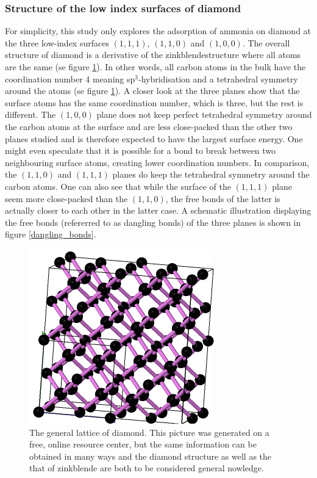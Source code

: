 \documentclass[10pt,a4paper]{article}
\begin{document}
\subsubsection{Structure of the low index surfaces of diamond}
For simplicity, this study only explores the adsorption of ammonia on diamond at the three low-index surfaces $(1,  1, 1)$, $(1,  1,  0)$ and $(1,  0,  0)$. The overall structure of diamond is a derivative of the zinkblendestructure where all atoms are the same (se figure \ref{diamond_general}). In other words, all carbon atoms in the bulk have the coordination number 4 meaning sp$^3$-hybridisation and a tetrahedral symmetry around the atoms  (se figure \ref{diamond_general}). A closer look at the three planes show that the surface atoms has the same coordination number, which is three, but the rest is different. The $(1,  0,  0)$ plane does not keep perfect tetrahedral symmetry around the carbon atoms at the surface and are less close-packed than the other two planes studied and is therefore expected to have the largest surface energy.  One might even speculate that it is possible for a bond to break between two neighbouring surface atoms, creating lower coordination numbers. In comparison, the $(1,  1,  0)$ and $(1,  1, 1)$ planes do keep the tetrahedral symmetry around the carbon atoms. One can also see that while the surface of the $(1,  1, 1)$ plane seem more close-packed than the $(1,  1,  0)$, the free bonds of the latter is actually closer to each other in the latter case. A schematic illustration displaying the free bonds (refererred to as dangling bonds) of the three planes is shown in figure  \ref{dangling_bonds}. 

\begin{figure} \captionsetup{width=.8\linewidth} \caption{The general lattice of diamond. This picture was generated on a free, online resource center, but the same information can be obtained in many ways and the diamond structure as well as the that of zinkblende are both to be considered general nowledge.} \label{diamond_general}
\includegraphics[width=.8\linewidth]{pictures/diamond_general.png}
\end{figure} 
\end{document}
